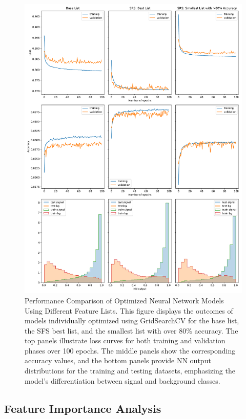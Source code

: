 \documentclass[]{article}
\begin{document}
\begin{figure}[h!]
	\centering
	\includegraphics[width=\linewidth]{best_model/best_models.pdf}
	\caption{Performance Comparison of Optimized Neural Network Models Using Different Feature Lists. This figure displays the outcomes of models individually optimized using GridSearchCV for the base list, the SFS best list, and the smallest list with over 80\% accuracy. The top panels illustrate loss curves for both training and validation phases over 100 epochs. The middle panels show the corresponding accuracy values, and the bottom panels provide NN output distributions for the training and testing datasets, emphasizing the model's differentiation between signal and background classes.}
	\label{fig:best_models}
\end{figure}

\clearpage

\subsection{Feature Importance Analysis}
\end{document}
